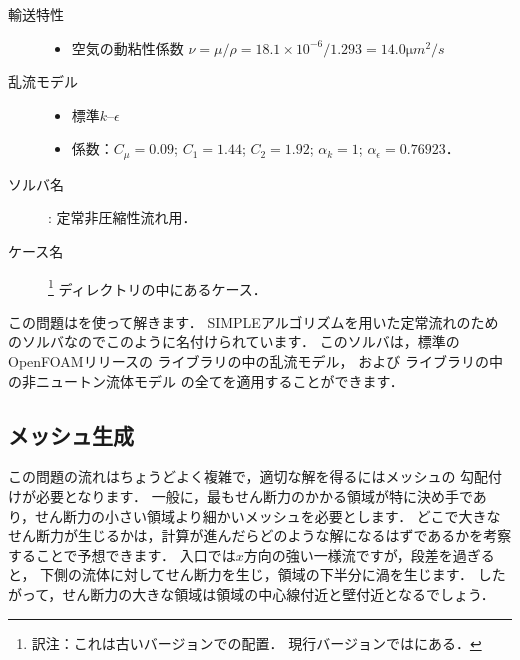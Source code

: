 \begin{description}
\begin{itemize}
            \end{itemize}
 \item[輸送特性] \mbox{}
            \begin{itemize}
             \item 空気の動粘性係数
                   $\nu = \mu/\rho = 18.1 \times 10^{-6}/1.293 = 14.0 \unit{\micro m^{2}/s}$
            \end{itemize}
 \item[乱流モデル] \mbox{}
            \begin{itemize}
             \item 標準$k$--$\epsilon$
             \item 係数：$C_{\mu} = 0.09$; $C_{1} = 1.44$; $C_{2} = 1.92$;
                   $\alpha_{k} = 1$; $\alpha_{\epsilon} = 0.76923$．
            \end{itemize}
 \item[ソルバ名]
 : 定常非圧縮性流れ用．
 \item[ケース名] %
\footnote{訳注：これは古いバージョンでの配置．
現行バージョンではにある．}%
            ディレクトリの中にあるケース．
\end{description}

この問題はを使って解きます．
SIMPLEアルゴリズムを用いた定常流れのためのソルバなのでこのように名付けられています．
このソルバは，標準のOpenFOAMリリースの
%
%
ライブラリの中の乱流モデル，
および
%
%
ライブラリの中の非ニュートン流体モデル
の全てを適用することができます．


\subsection{メッシュ生成}
\label{ssec:3.2.2}
この問題の流れはちょうどよく複雑で，適切な解を得るにはメッシュの
%
勾配付けが必要となります．
一般に，最もせん断力のかかる領域が特に決め手であり，せん断力の小さい領域より細かいメッシュを必要とします．
どこで大きなせん断力が生じるかは，計算が進んだらどのような解になるはずであるかを考察することで予想できます．
入口では$x$方向の強い一様流ですが，段差を過ぎると，
下側の流体に対してせん断力を生じ，領域の下半分に渦を生じます．
したがって，せん断力の大きな領域は領域の中心線付近と壁付近となるでしょう．

